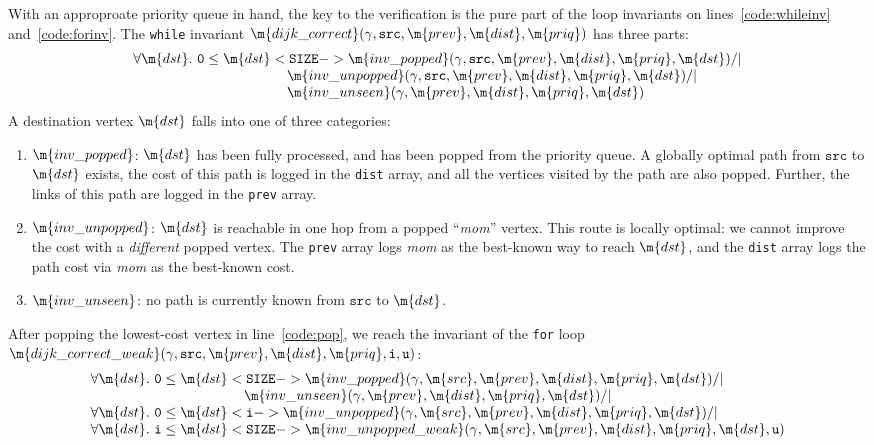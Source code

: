 With an approproate priority queue in hand, 
the key to the verification is the pure part of the loop
invariants on lines~\ref{code:whileinv} and~\ref{code:forinv}.  The \texttt{while} invariant $\m{dijk\_correct}(\gamma, \texttt{src}, \m{prev}, \m{dist}, \m{priq})$ has three parts:
\[
\begin{array}{l}
\forall \m{dst}.~\texttt{0} \le \m{dst} < \texttt{SIZE} -> \m{inv\_popped}(\gamma, \texttt{src}, \m{prev}, \m{dist}, \m{priq}, \m{dst}) /| \null \\
\hspace{11em}\m{inv\_unpopped}(\gamma, \texttt{src}, \m{prev}, \m{dist}, \m{priq}, \m{dst}) /| \null \\
\hspace{11em}\m{inv\_unseen}(\gamma, \m{prev}, \m{dist}, \m{priq}, \m{dst})
\end{array}
\]
A destination vertex $\m{dst}$ falls into one of three
categories:
\begin{enumerate}
\item $\m{inv\_popped}$: $\m{dst}$ has been fully processed, and has been
popped from the priority queue.
A globally optimal path from $\texttt{src}$
to $\m{dst}$ exists, the cost of this path is logged in
the \texttt{dist} array, and all the vertices visited by the path are also popped.
Further, the links of this path are logged in the \texttt{prev} array.
\item $\m{inv\_unpopped}$: $\m{dst}$ is reachable in
one hop from a popped ``\emph{mom}'' vertex.
This route is locally optimal: we cannot
improve the cost with a \emph{different} popped vertex.
The \texttt{prev} array logs
\emph{mom} as the best-known way to reach $\m{dst}$, and the \texttt{dist}
array logs the path cost via \emph{mom} as the best-known cost.
\item $\m{inv\_unseen}$: no path is currently known from $\texttt{src}$ to $\m{dst}$.
\end{enumerate}
After popping the lowest-cost vertex in line~\ref{code:pop}, we reach the invariant of
the \texttt{for} loop $\m{dijk\_correct\_weak}(\gamma, \texttt{src}, \m{prev}, \m{dist}, \m{priq}, \texttt{i}, \texttt{u})$:
\[
\begin{array}{l}
\forall \m{dst}.~\texttt{0} \le \m{dst} < \texttt{SIZE} -> \m{inv\_popped}(\gamma, \m{src}, \m{prev}, \m{dist}, \m{priq}, \m{dst}) /| \null \\
\hspace{11em}\m{inv\_unseen}(\gamma, \m{prev}, \m{dist}, \m{priq}, \m{dst}) /| \null \\
\forall \m{dst}.~\texttt{0} \le \m{dst} < \texttt{i} -> \m{inv\_unpopped}(\gamma, \m{src}, \m{prev}, \m{dist}, \m{priq}, \m{dst}) /| \null \\
\forall \m{dst}.~\texttt{i} \le \m{dst} < \texttt{SIZE} -> \m{inv\_unpopped\_weak}(\gamma, \m{src}, \m{prev}, \m{dist}, \m{priq}, \m{dst}, \texttt{u})
\end{array}
\]
